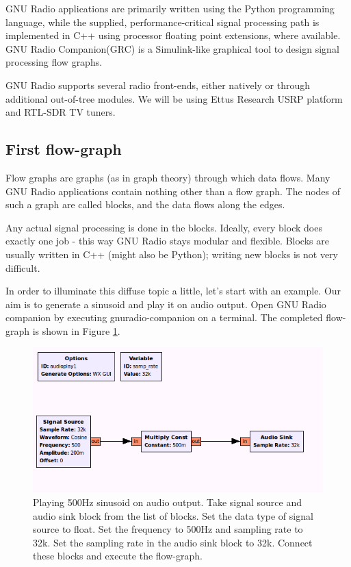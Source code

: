 \documentclass[a4paper,10pt]{article}
\begin{document}
GNU Radio applications are primarily written using the Python programming language, 
while the supplied, performance-critical signal processing path is implemented in C++
using processor floating point extensions, where available.
GNU Radio Companion(GRC) is a Simulink-like graphical tool to design signal processing flow graphs.

GNU Radio supports several radio front-ends, either natively or through additional out-of-tree modules.
We will be using Ettus Research USRP platform and RTL-SDR TV tuners.

\subsection{First flow-graph}
Flow graphs are graphs (as in graph theory) through which data flows.
Many GNU Radio applications contain nothing other than a flow graph.
The nodes of such a graph are called blocks, and the data flows along the edges.

Any actual signal processing is done in the blocks.
Ideally, every block does exactly one job - this way GNU Radio stays modular and flexible.
Blocks are usually written in C++ (might also be Python); writing new blocks is not very difficult.

In order to illuminate this diffuse topic a little, let's start with an example.
Our aim is to generate a sinusoid and play it on audio output.
Open GNU Radio companion by executing gnuradio-companion on a terminal. 
The completed flow-graph is shown in Figure \ref{fig:audio-play1}.
\begin{figure}
\centering
 \includegraphics[scale=0.40]{figures/audio-play1.png}
 \caption{Playing 500Hz sinusoid on audio output.
 Take signal source and audio sink block from the list of blocks.
 Set the data type of signal source to float.
 Set the frequency to 500Hz and sampling rate to 32k.
 Set the sampling rate in the audio sink block to 32k.
 Connect these blocks and execute the flow-graph.\label{fig:audio-play1}}
\end{figure}
\end{document}

